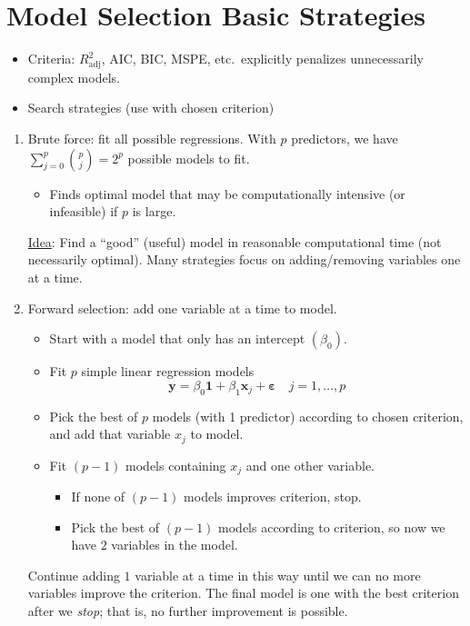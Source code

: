\section{Model Selection Basic Strategies}
\begin{itemize}
    \item Criteria: $ R^2_{\text{adj}} $, AIC, BIC,
          MSPE, etc.\ explicitly penalizes unnecessarily
          complex models.
    \item Search strategies (use with chosen
          criterion)
\end{itemize}
\begin{enumerate}[label=(\roman*)]
    \item Brute force: fit all possible regressions.
          With $ p $ predictors, we have
          $ \sum_{j=0}^{p} \binom{p}{j}=2^p $ possible models to fit.
          \begin{itemize}
              \item Finds optimal model that may be computationally
                    intensive (or infeasible) if $ p $ is large.
          \end{itemize}

          \underline{Idea}: Find a ``good'' (useful)
          model in reasonable computational time (not necessarily optimal).
          Many strategies focus on adding/removing variables one at a time.
    \item Forward selection: add one variable at a time to model.
          \begin{itemize}
              \item Start with a model that only has an intercept $ (\beta_0) $.
              \item Fit $ p $ simple linear regression models
                    \[ \symbf{y}=\beta_0 \symbf{1}+\beta_1\symbf{x}_j
                        +\symbf{\varepsilon}\quad j=1,\ldots,p \]
              \item Pick the best of $ p $ models (with 1 predictor)
                    according to chosen criterion, and add that variable
                    $ x_j $ to model.
              \item Fit $ (p-1) $ models containing $ x_j $
                    and one other variable.
                    \begin{itemize}
                        \item If none of $ (p-1) $ models improves
                              criterion, stop.
                        \item Pick the best of $ (p-1) $ models according
                              to criterion, so now we have $ 2 $ variables in the model.
                    \end{itemize}
          \end{itemize}
          Continue adding $ 1 $ variable at a time in this way until
          we can no more variables improve the criterion. The final
          model is one with the best criterion after we \emph{stop};
          that is, no further improvement is possible.


\end{enumerate}
